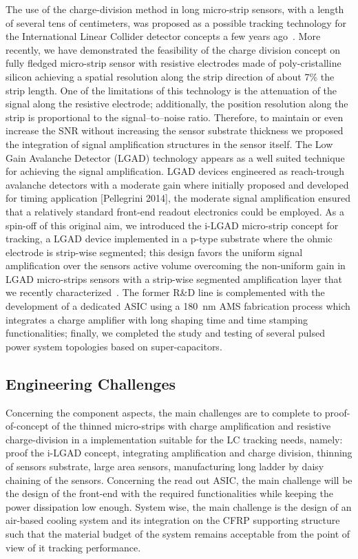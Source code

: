 The use of the charge-division method in long micro-strip sensors, with a length of several tens of centimeters, was proposed as a possible tracking technology for the International Linear Collider detector concepts a few years ago~\cite{Carman:2011zz}. More recently, we have demonstrated \cite{2012JInst...7.2005B,Bassignana2013186,Curras:ICHEP2014} the feasibility of the charge division concept on fully fledged micro-strip sensor with resistive electrodes made of poly-cristalline silicon achieving a spatial resolution along the strip direction of about 7\% the strip length. One of the limitations of this technology is the attenuation of the signal along the resistive electrode; additionally, the position resolution along the strip is proportional to the signal--to--noise ratio. Therefore, to maintain or even increase the SNR without increasing the sensor substrate thickness we proposed the integration of signal amplification structures in the sensor itself. The Low Gain Avalanche Detector (LGAD) technology appears as a well suited technique for achieving the signal amplification.
LGAD devices engineered as reach-trough avalanche detectors with a moderate gain where initially proposed and developed for timing application [Pellegrini 2014], the moderate signal amplification ensured that a relatively standard front-end readout electronics could be employed. As a spin-off of this original aim, we introduced the i-LGAD micro-strip concept for tracking, a LGAD device implemented in a p-type substrate where the ohmic electrode is strip-wise segmented; this design favors the uniform signal amplification over the sensors active volume overcoming the non-uniform gain in LGAD micro-strips sensors with a strip-wise segmented amplification layer that we recently characterized~\cite{Pellegrini:Hiroshima2015,Vila:LCWS2015}.
The former R\&D line is complemented with the development of a dedicated ASIC using a \SI{180}{nm} AMS fabrication process which integrates a charge amplifier with long shaping time and time stamping functionalities; finally, we completed the study and testing of several pulsed power system topologies based on super-capacitors.

\subsection{Engineering Challenges}
Concerning the component aspects, the main challenges are to complete to proof-of-concept of the thinned micro-strips with charge amplification and resistive charge-division in a implementation suitable for the LC tracking needs, namely:  proof the i-LGAD concept, integrating amplification and charge division, thinning of sensors substrate, large area sensors, manufacturing long ladder by daisy chaining of the sensors. Concerning the read out ASIC, the main challenge will be the design of the front-end with the required functionalities while keeping the power dissipation low enough.
System wise, the main challenge is the design of an air-based cooling system and its integration on the CFRP supporting structure such that the material budget of the system remains acceptable from the point of view of it tracking performance.


